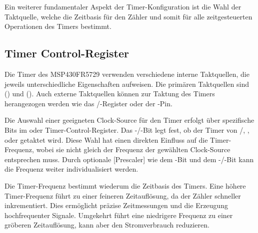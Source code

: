 Ein weiterer fundamentaler Aspekt der Timer-Konfiguration ist \ua die Wahl der Taktquelle, welche die Zeitbasis f\"ur den Z\"ahler und somit f\"ur alle zeitgesteuerten Operationen des Timers bestimmt.\AI

\subsection{Timer Control-Register}
\label{sec:TimerControlRegister}

Die Timer des MSP430FR5729 verwenden verschiedene interne Taktquellen, die jeweils unterschiedliche Eigenschaften aufweisen. Die prim\"aren Taktquellen sind  () und  (). Auch externe Taktquellen k\"onnen zur Taktung des Timers herangezogen werden wie \zB das /-Register oder der -Pin. \\

Die Auswahl einer geeigneten \glqq Clock-Source\grqq{} f\"ur den Timer erfolgt \"uber spezifische Bits im  oder  Timer-Control-Register. Das -/-Bit legt fest, ob der Timer von /, ,  oder  getaktet wird. Diese Wahl hat einen direkten Einfluss auf die Timer-Frequenz, wobei sie nicht gleich der Frequenz der gew\"ahlten Clock-Source entsprechen muss. Durch optionale [Prescaler] wie dem -Bit und dem -/-Bit kann die Frequenz weiter individualisiert werden. 

\newpage
Die Timer-Frequenz bestimmt wiederum die Zeitbasis des Timers. Eine h\"ohere Timer-Frequenz f\"uhrt zu einer feineren Zeitaufl\"osung, da der Z\"ahler schneller inkrementiert. Dies erm\"oglicht pr\"azise Zeitmessungen und die Erzeugung hochfrequenter Signale. Umgekehrt f\"uhrt eine niedrigere Frequenz zu einer gr\"oberen Zeitaufl\"osung, kann aber den Stromverbrauch reduzieren.

